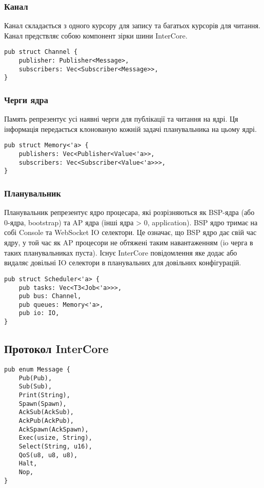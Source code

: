 \begin{definition}
\begin{definition}
\begin{definition}
\begin{definition}
\paragraph{}
\subsubsection{Канал}
Канал складається з одного курсору для запису та багатьох курсорів для читання.
Канал предствляє собою компонент зірки шини InterCore.
\begin{lstlisting}
pub struct Channel {
    publisher: Publisher<Message>,
    subscribers: Vec<Subscriber<Message>>,
}
\end{lstlisting}

\subsubsection{Черги ядра}
Память репрезентує усі наявні черги для публікації та читання на ядрі.
Ця інформація передається клонованую кожній задачі планувальника на цьому ядрі.
\begin{lstlisting}
pub struct Memory<'a> {
    publishers: Vec<Publisher<Value<'a>>,
    subscribers: Vec<Subscriber<Value<'a>>>,
}
\end{lstlisting}

\subsubsection{Планувальник}
Планувальник репрезентує ядро процесара,
які розрізняються як BSP-ядра (або 0-ядра, bootstrap)
та AP ядра (інші ядра > 0, application). BSP ядро
тримає на собі Console та WebSocket IO селектори.
Це означає, що BSP ядро дає свій час ядру, у той час як AP процесори не обтяжені
таким навантаженням (io черга в таких планувальниках пуста).
Існує InterCore повідомлення яке додає або видаляє довільні IO селектори
в планувальних для довільних конфігурацій.

\begin{lstlisting}
pub struct Scheduler<'a> {
    pub tasks: Vec<T3<Job<'a>>>,
    pub bus: Channel,
    pub queues: Memory<'a>,
    pub io: IO,
}
\end{lstlisting}

\subsection{Протокол InterCore}

\begin{lstlisting}
pub enum Message {
    Pub(Pub),
    Sub(Sub),
    Print(String),
    Spawn(Spawn),
    AckSub(AckSub),
    AckPub(AckPub),
    AckSpawn(AckSpawn),
    Exec(usize, String),
    Select(String, u16),
    QoS(u8, u8, u8),
    Halt,
    Nop,
}
\end{lstlisting}


\end{definition}
\end{definition}
\end{definition}
\end{definition}
